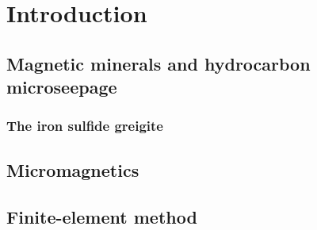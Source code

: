 \chapter{Introduction}

\section{Magnetic minerals and hydrocarbon microseepage}

\subsection{The iron sulfide greigite}

\section{Micromagnetics}

\section{Finite-element method}

\renewcommand\bibname{{References}}



